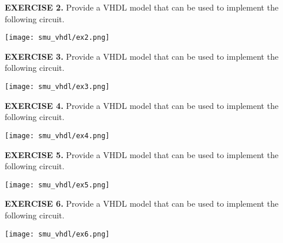 \vspace{20pt}
\noindent
\begin{minipage}[t]{0.5\textwidth}
\textbf{EXERCISE 2.}
Provide a VHDL model that can be used to implement the following circuit.
\end{minipage}
\begin{minipage}[t]{0.47\textwidth}
\vspace{0pt}\raggedright
\centering
\texttt{[image: smu\_vhdl/ex2.png]}
\end{minipage}


\vspace{20pt}
\noindent
\begin{minipage}[t]{0.5\textwidth}
\textbf{EXERCISE 3.}
Provide a VHDL model that can be used to implement the following circuit. 
\end{minipage}
\begin{minipage}[t]{0.47\textwidth}
\vspace{0pt}\raggedright
\centering
\texttt{[image: smu\_vhdl/ex3.png]}
\end{minipage}

\vspace{20pt}
\noindent
\begin{minipage}[t]{0.5\textwidth}
\textbf{EXERCISE 4.}
Provide a VHDL model that can be used to implement the following circuit.
\end{minipage}
\begin{minipage}[t]{0.47\textwidth}
\vspace{0pt}\raggedright
\centering
\texttt{[image: smu\_vhdl/ex4.png]}
\end{minipage}

\vspace{20pt}
\noindent
\begin{minipage}[t]{0.5\textwidth}
\textbf{EXERCISE 5.}
Provide a VHDL model that can be used to implement the following circuit.
\end{minipage}
\begin{minipage}[t]{0.47\textwidth}
\vspace{0pt}\raggedright
\centering
\texttt{[image: smu\_vhdl/ex5.png]}
\end{minipage}

\vspace{20pt}
\noindent
\begin{minipage}[t]{0.5\textwidth}
\textbf{EXERCISE 6.}
Provide a VHDL model that can be used to implement the following circuit.
\end{minipage}
\begin{minipage}[t]{0.47\textwidth}
\vspace{0pt}\raggedright
\centering
\texttt{[image: smu\_vhdl/ex6.png]}
\end{minipage}




